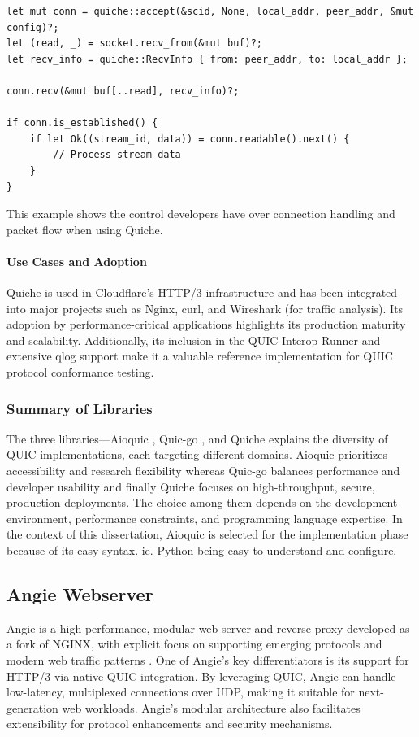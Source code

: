 \begin{lstlisting}[breaklines=true,basicstyle=\small\ttfamily,frame=single]
let mut conn = quiche::accept(&scid, None, local_addr, peer_addr, &mut config)?;
let (read, _) = socket.recv_from(&mut buf)?;
let recv_info = quiche::RecvInfo { from: peer_addr, to: local_addr };

conn.recv(&mut buf[..read], recv_info)?;

if conn.is_established() {
    if let Ok((stream_id, data)) = conn.readable().next() {
        // Process stream data
    }
}
\end{lstlisting}

This example shows the control developers have over connection handling and packet flow when using Quiche.

\paragraph{Use Cases and Adoption}
Quiche is used in Cloudflare's HTTP/3 infrastructure and has been integrated into major projects such as Nginx, curl, and Wireshark (for traffic analysis). Its adoption by performance-critical applications highlights its production maturity and scalability. Additionally, its inclusion in the QUIC Interop Runner and extensive qlog support make it a valuable reference implementation for QUIC protocol conformance testing.

\subsubsection{Summary of Libraries}
The three libraries—Aioquic \cite{aioquic-repo}, Quic-go \cite{quic-go-repo}, and Quiche \cite{quiche-repo} explains the diversity of QUIC implementations, each targeting different domains. Aioquic prioritizes accessibility and research flexibility whereas Quic-go balances performance and developer usability and finally Quiche focuses on high-throughput, secure, production deployments. The choice among them depends on the development environment, performance constraints, and programming language expertise. In the context of this dissertation, Aioquic is selected for the implementation phase because of its easy syntax.  ie. Python being easy to understand and configure.

\subsection{Angie Webserver}
Angie is a high-performance, modular web server and reverse proxy developed as a fork of NGINX, with explicit focus on supporting emerging protocols and modern web traffic patterns \cite{angie-docs}. One of Angie's key differentiators is its support for HTTP/3 via native QUIC integration. By leveraging QUIC, Angie can handle low-latency, multiplexed connections over UDP, making it suitable for next-generation web workloads. Angie's modular architecture also facilitates extensibility for protocol enhancements and security mechanisms.

